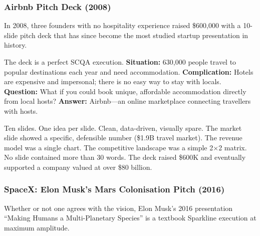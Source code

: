 \subsubsection{Airbnb Pitch Deck (2008)}


In 2008, three founders with no hospitality experience raised \$600,000 with a 10-slide pitch deck that has since become the most studied startup presentation in history.

The deck is a perfect SCQA execution. \textbf{Situation:} 630,000 people travel to popular destinations each year and need accommodation. \textbf{Complication:} Hotels are expensive and impersonal; there is no easy way to stay with locals. \textbf{Question:} What if you could book unique, affordable accommodation directly from local hosts? \textbf{Answer:} Airbnb---an online marketplace connecting travellers with hosts.

Ten slides. One idea per slide. Clean, data-driven, visually spare. The market slide showed a specific, defensible number (\$1.9B travel market). The revenue model was a single chart. The competitive landscape was a simple 2$\times$2 matrix. No slide contained more than 30 words. The deck raised \$600K and eventually supported a company valued at over \$80 billion.

\subsubsection{SpaceX: Elon Musk's Mars Colonisation Pitch (2016)}

Whether or not one agrees with the vision, Elon Musk's 2016 presentation ``Making Humans a Multi-Planetary Species'' is a textbook Sparkline execution at maximum amplitude.

